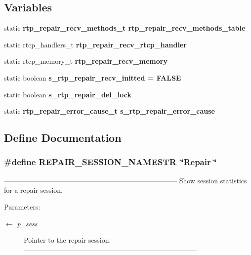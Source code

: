 \subsection*{Variables}
\begin{CompactItemize}
\item 
static \bf{rtp\_\-repair\_\-recv\_\-methods\_\-t} \bf{rtp\_\-repair\_\-recv\_\-methods\_\-table}
\item 
static rtcp\_\-handlers\_\-t \bf{rtp\_\-repair\_\-recv\_\-rtcp\_\-handler}
\item 
static rtcp\_\-memory\_\-t \bf{rtp\_\-repair\_\-recv\_\-memory}
\item 
static boolean \bf{s\_\-rtp\_\-repair\_\-recv\_\-initted} = \bf{FALSE}
\item 
static boolean \bf{s\_\-rtp\_\-repair\_\-del\_\-lock}
\item 
static \bf{rtp\_\-repair\_\-error\_\-cause\_\-t} \bf{s\_\-rtp\_\-repair\_\-error\_\-cause}
\end{CompactItemize}


\subsection{Define Documentation}
\subsubsection{\setlength{\rightskip}{0pt plus 5cm}\#define REPAIR\_\-SESSION\_\-NAMESTR~\char`\"{}Repair \char`\"{}}\label{rtp__repair__recv_8c_5d49897c464fee6a8c9cad3d7f476ef0}


--------------------------------------------------------------------------- Show session statistics for a repair session.

\begin{Desc}
\item[Parameters:]
\begin{description}
\item[\mbox{$\leftarrow$} {\em p\_\-sess}]Pointer to the repair session. --------------------------------------------------------------------------- \end{description}
\end{Desc}
